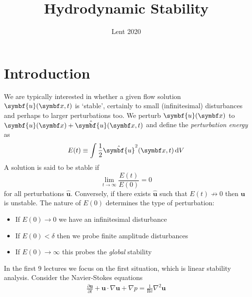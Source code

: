 \documentclass{jknotes}
\renewcommand{\u}{\symbf{u}}
\begin{document}
\title{Hydrodynamic Stability}
\date{Lent 2020}

\maketitle
\suggestionsspiel
\tableofcontents

\section{Introduction}
We are typically interested in whether a given flow solution $\u(\x,t)$ is
`stable', certainly to small (infinitesimal) disturbances and perhaps to
larger perturbations too. We perturb $\u(\x)$ to $\u(\x) + \hat{\u}(\x,t)$ and
define the \emph{perturbation energy} as
\begin{equation}
	E(t) \equiv \int \frac{1}{2}\hat{\u}^2(\x,t) \, \diffd V
\end{equation}
A solution is said to be stable if
\begin{equation}
	\lim_{t \to \infty} \frac{E(t)}{E(0)} = 0
\end{equation}
for all perturbations $\hat{\u}$. Conversely, if there exists $\hat{\u}$ such
that $E(t) \not\rightarrow 0$ then $\u$ is unstable. The nature of $E(0)$
determines the type of perturbation:
\begin{itemize}
	\item If $E(0) \to 0$ we have an infinitesimal disturbance
	\item If $E(0) < \delta$ then we probe finite amplitude disturbances
	\item If $E(0) \to \infty$ this probes the \emph{global} stability
\end{itemize}

In the first 9 lectures we focus on the first situation, which is linear
stability analysis. Consider the Navier-Stokes equations
\begin{align}
	\frac{\partial \u}{\partial t} + \u \cdot \nabla \u + \nabla p =
	\frac{1}{\text{Re}} \nabla^2 \u
\end{align}
\end{document}
